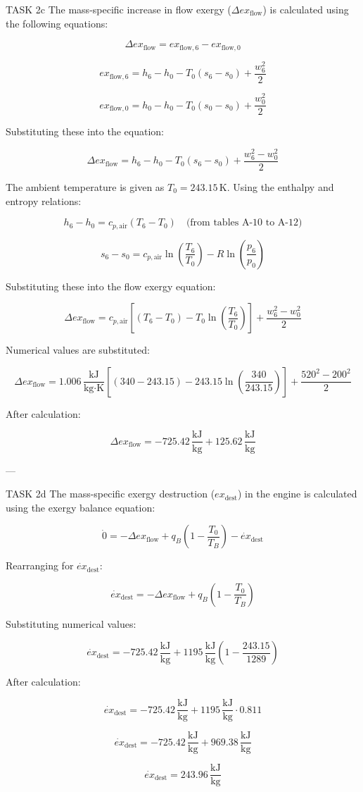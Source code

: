 TASK 2c  
The mass-specific increase in flow exergy (\( \Delta ex_{\text{flow}} \)) is calculated using the following equations:

\[
\Delta ex_{\text{flow}} = ex_{\text{flow},6} - ex_{\text{flow},0}
\]

\[
ex_{\text{flow},6} = h_6 - h_0 - T_0 (s_6 - s_0) + \frac{w_6^2}{2}
\]

\[
ex_{\text{flow},0} = h_0 - h_0 - T_0 (s_0 - s_0) + \frac{w_0^2}{2}
\]

Substituting these into the equation:

\[
\Delta ex_{\text{flow}} = h_6 - h_0 - T_0 (s_6 - s_0) + \frac{w_6^2 - w_0^2}{2}
\]

The ambient temperature is given as \( T_0 = 243.15 \, \text{K} \). Using the enthalpy and entropy relations:

\[
h_6 - h_0 = c_{p,\text{air}} (T_6 - T_0) \quad \text{(from tables A-10 to A-12)}
\]

\[
s_6 - s_0 = c_{p,\text{air}} \ln \left( \frac{T_6}{T_0} \right) - R \ln \left( \frac{p_6}{p_0} \right)
\]

Substituting these into the flow exergy equation:

\[
\Delta ex_{\text{flow}} = c_{p,\text{air}} \left[ (T_6 - T_0) - T_0 \ln \left( \frac{T_6}{T_0} \right) \right] + \frac{w_6^2 - w_0^2}{2}
\]

Numerical values are substituted:

\[
\Delta ex_{\text{flow}} = 1.006 \, \frac{\text{kJ}}{\text{kg·K}} \left[ (340 - 243.15) - 243.15 \ln \left( \frac{340}{243.15} \right) \right] + \frac{520^2 - 200^2}{2}
\]

After calculation:

\[
\Delta ex_{\text{flow}} = -725.42 \, \frac{\text{kJ}}{\text{kg}} + 125.62 \, \frac{\text{kJ}}{\text{kg}}
\]

---

TASK 2d  
The mass-specific exergy destruction (\( ex_{\text{dest}} \)) in the engine is calculated using the exergy balance equation:

\[
\dot{0} = -\Delta ex_{\text{flow}} + q_B \left( 1 - \frac{T_0}{T_B} \right) - \dot{ex}_{\text{dest}}
\]

Rearranging for \( \dot{ex}_{\text{dest}} \):

\[
\dot{ex}_{\text{dest}} = -\Delta ex_{\text{flow}} + q_B \left( 1 - \frac{T_0}{T_B} \right)
\]

Substituting numerical values:

\[
\dot{ex}_{\text{dest}} = -725.42 \, \frac{\text{kJ}}{\text{kg}} + 1195 \, \frac{\text{kJ}}{\text{kg}} \left( 1 - \frac{243.15}{1289} \right)
\]

After calculation:

\[
\dot{ex}_{\text{dest}} = -725.42 \, \frac{\text{kJ}}{\text{kg}} + 1195 \, \frac{\text{kJ}}{\text{kg}} \cdot 0.811
\]

\[
\dot{ex}_{\text{dest}} = -725.42 \, \frac{\text{kJ}}{\text{kg}} + 969.38 \, \frac{\text{kJ}}{\text{kg}}
\]

\[
\dot{ex}_{\text{dest}} = 243.96 \, \frac{\text{kJ}}{\text{kg}}
\]